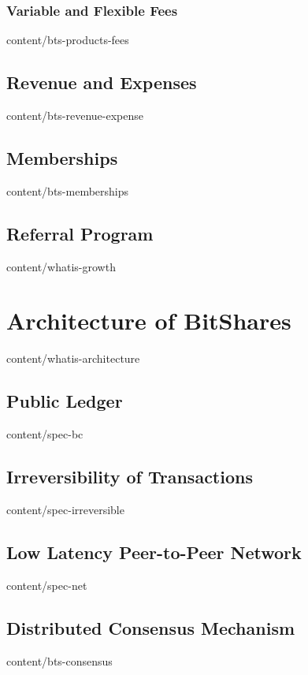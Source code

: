 \documentclass{btswhitepaper}
\begin{document}
\subsubsection { Variable and Flexible Fees        }  { content/bts-products-fees   }

\subsection    { Revenue and Expenses              }  { content/bts-revenue-expense }
\subsection    { Memberships                       }  { content/bts-memberships     }
\subsection    { Referral Program                  }  { content/whatis-growth       } 

\section       { Architecture of BitShares         }  { content/whatis-architecture } 
\subsection    { Public Ledger                     }  { content/spec-bc             } 
\subsection    { Irreversibility of Transactions   }  { content/spec-irreversible   }
\subsection    { Low Latency Peer-to-Peer Network  }  { content/spec-net            } 
\subsection    { Distributed Consensus Mechanism   }  { content/bts-consensus       } 
\end{document}

